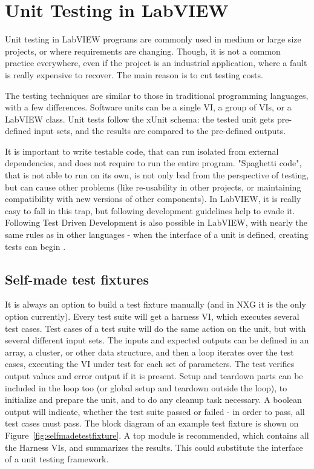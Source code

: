 \chapter{Unit Testing in LabVIEW}

Unit testing in LabVIEW programs are commonly used in medium or large size projects, or where requirements are changing. Though, it is not a common practice everywhere, even if the project is an industrial application, where a fault is really expensive to recover. The main reason is to cut testing costs.

The testing techniques are similar to those in traditional programming languages, with a few differences. Software units can be a single VI, a group of VIs, or a LabVIEW class. Unit tests follow the xUnit schema: the tested unit gets pre-defined input sets, and the results are compared to the pre-defined outputs.

It is important to write testable code, that can run isolated from external dependencies, and does not require to run the entire program. "Spaghetti code", that is not able to run on its own, is not only bad from the perspective of testing, but can cause other problems (like re-usability in other projects, or maintaining compatibility with new versions of other components). In LabVIEW, it is really easy to fall in this trap, but following development guidelines help to evade it. Following Test Driven Development is also possible in LabVIEW, with nearly the same rules as in other languages - when the interface of a unit is defined, creating tests can begin \cite{delacor_ni2014}. 

\section{Self-made test fixtures}
It is always an option to build a test fixture manually (and in NXG it is the only option currently). Every test suite will get a harness VI, which executes several test cases. Test cases of a test suite will do the same action on the unit, but with several different input sets. The inputs and expected outputs can be defined in an array, a cluster, or other data structure, and then a loop iterates over the test cases, executing the VI under test for each set of parameters. The test verifies output values and error output if it is present. Setup and teardown parts can be included in the loop too (or global setup and teardown outside the loop), to initialize and prepare the unit, and to do any cleanup task necessary. A boolean output will indicate, whether the test suite passed or failed - in order to pass, all test cases must pass. The block diagram of an example test fixture is shown on Figure~\ref{fig:selfmadetestfixture}.
A top module is recommended, which contains all the Harness VIs, and summarizes the results. This could substitute the interface of a unit testing framework. 

